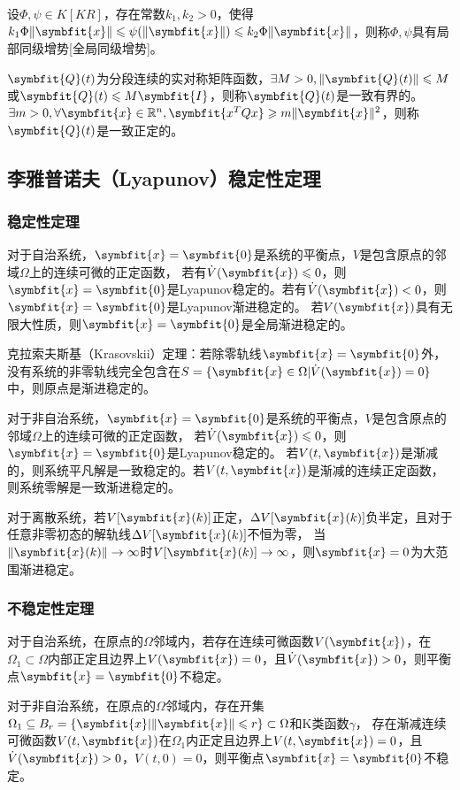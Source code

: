 \documentclass[11pt,a4paper]{ctexart}
\newcommand{\bm}{\symbfit}
\begin{document}
        设$\Phi,\psi\in K[KR]$，存在常数$k_1,k_2>0$，使得$k_1\Phi\|\bm{x}\|\leqslant\psi(\|\bm{x}\|)\leqslant k_2\Phi\|\bm{x}\|$，则称$\Phi,\psi$具有局部同级增势[全局同级增势]。

        $\bm{Q}(t)$为分段连续的实对称矩阵函数，$\exists M>0,\|\bm{Q}(t)\|\leqslant M$或$\bm{Q}(t)\leqslant M\bm{I}$，则称$\bm{Q}(t)$是一致有界的。
        $\exists m>0,\forall \bm{x}\in\mathbb{R}^n,\bm{x^T Qx}\geqslant m\|\bm{x}\|^2$，则称$\bm{Q}(t)$是一致正定的。
    \subsection{李雅普诺夫（Lyapunov）稳定性定理}
        \subsubsection{稳定性定理}
            对于自治系统，$\bm{x}=\bm{0}$是系统的平衡点，$V$是包含原点的邻域$\Omega$上的连续可微的正定函数，
            若有$\dot V(\bm{x})\leqslant0$，则$\bm{x}=\bm{0}$是Lyapunov稳定的。若有$\dot V(\bm{x})<0$，则$\bm{x}=\bm{0}$是Lyapunov渐进稳定的。
            若$V(\bm{x})$具有无限大性质，则$\bm{x}=\bm{0}$是全局渐进稳定的。

            克拉索夫斯基（Krasovskii）定理：若除零轨线$\bm{x}=\bm{0}$外，没有系统的非零轨线完全包含在$S=\{\bm{x}\in\Omega|\dot{V}(\bm{x})=0\}$中，则原点是渐进稳定的。

            对于非自治系统，$\bm{x}=\bm{0}$是系统的平衡点，$V$是包含原点的邻域$\Omega$上的连续可微的正定函数，
            若$\dot V(\bm{x})\leqslant0$，则$\bm{x}=\bm{0}$是Lyapunov稳定的。
            若$V(t,\bm{x})$是渐减的，则系统平凡解是一致稳定的。若$V(t,\bm{x})$是渐减的连续正定函数，则系统零解是一致渐进稳定的。

            对于离散系统，若$V[\bm{x}(k)]$正定，$\Delta V[\bm{x}(k)]$负半定，且对于任意非零初态的解轨线$\Delta V[\bm{x}(k)]$不恒为零，
            当$\|\bm{x}(k)\|\rightarrow\infty$时$V[\bm{x}(k)]\rightarrow\infty$，则$\bm{x}=0$为大范围渐进稳定。
        \subsubsection{不稳定性定理}
            对于自治系统，在原点的$\Omega$邻域内，若存在连续可微函数$V(\bm{x})$，在$\Omega_1\subset\Omega$内部正定且边界上$V(\bm{x})=0$，且$\dot V(\bm{x})>0$，则平衡点$\bm{x}=\bm{0}$不稳定。
            
            对于非自治系统，在原点的$\Omega$邻域内，存在开集$\Omega_1\subseteq B_r=\{\bm{x}|\|\bm{x}\|\leqslant r\}\subset \Omega $和K类函数$\gamma$，
            存在渐减连续可微函数$V(t,\bm{x})$在$\Omega_1$内正定且边界上$V(t,\bm{x})=0$，且$\dot V(\bm{x})>0$，$V(t,0)=0$，则平衡点$\bm{x}=\bm{0}$不稳定。
\end{document}
